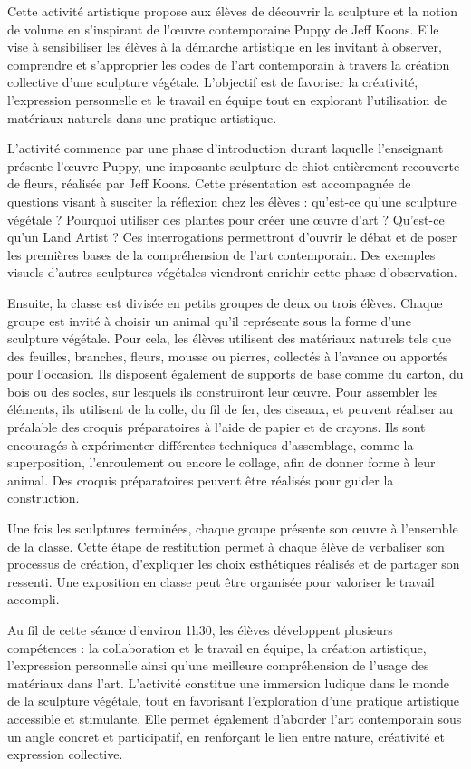 \documentclass[12pt]{article}
\begin{document}
Cette activité artistique propose aux élèves de découvrir la sculpture et la notion de volume en s’inspirant de l’œuvre contemporaine Puppy de Jeff Koons. Elle vise à sensibiliser les élèves à la démarche artistique en les invitant à observer, comprendre et s’approprier les codes de l’art contemporain à travers la création collective d’une sculpture végétale. L’objectif est de favoriser la créativité, l’expression personnelle et le travail en équipe tout en explorant l’utilisation de matériaux naturels dans une pratique artistique.

L’activité commence par une phase d’introduction durant laquelle l’enseignant présente l’œuvre Puppy, une imposante sculpture de chiot entièrement recouverte de fleurs, réalisée par Jeff Koons. Cette présentation est accompagnée de questions visant à susciter la réflexion chez les élèves : qu’est-ce qu’une sculpture végétale ? Pourquoi utiliser des plantes pour créer une œuvre d’art ? Qu’est-ce qu’un Land Artist ? Ces interrogations permettront d’ouvrir le débat et de poser les premières bases de la compréhension de l’art contemporain. Des exemples visuels d’autres sculptures végétales viendront enrichir cette phase d’observation.

Ensuite, la classe est divisée en petits groupes de deux ou trois élèves. Chaque groupe est invité à choisir un animal qu’il représente sous la forme d’une sculpture végétale. Pour cela, les élèves utilisent des matériaux naturels tels que des feuilles, branches, fleurs, mousse ou pierres, collectés à l’avance ou apportés pour l’occasion. Ils disposent également de supports de base comme du carton, du bois ou des socles, sur lesquels ils construiront leur œuvre. Pour assembler les éléments, ils utilisent de la colle, du fil de fer, des ciseaux, et peuvent réaliser au préalable des croquis préparatoires à l’aide de papier et de crayons. Ils sont encouragés à expérimenter différentes techniques d’assemblage, comme la superposition, l’enroulement ou encore le collage, afin de donner forme à leur animal. Des croquis préparatoires peuvent être réalisés pour guider la construction.

Une fois les sculptures terminées, chaque groupe présente son œuvre à l’ensemble de la classe. Cette étape de restitution permet à chaque élève de verbaliser son processus de création, d’expliquer les choix esthétiques réalisés et de partager son ressenti. Une exposition en classe peut être organisée pour valoriser le travail accompli.

Au fil de cette séance d’environ 1h30, les élèves développent plusieurs compétences : la collaboration et le travail en équipe, la création artistique, l’expression personnelle ainsi qu’une meilleure compréhension de l’usage des matériaux dans l’art. L’activité constitue une immersion ludique dans le monde de la sculpture végétale, tout en favorisant l’exploration d’une pratique artistique accessible et stimulante. Elle permet également d’aborder l’art contemporain sous un angle concret et participatif, en renforçant le lien entre nature, créativité et expression collective.
\end{document}
